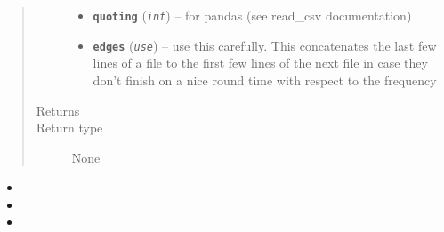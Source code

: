 \documentclass[a4paper,10pt,oneside]{sphinxmanual}
\begin{document}
\begin{fulllineitems}
\begin{quote}
\begin{description}
\begin{itemize}
\item {} 
\textbf{\texttt{quoting}} (\emph{\texttt{int}}) -- for pandas (see read\_csv documentation)

\item {} 
\textbf{\texttt{edges}} (\emph{\texttt{use}}) -- use this carefully. This concatenates the last few lines of a file to the first few lines
of the next file in case they don't finish on a nice round time with respect to the frequency

\end{itemize}

\item[{Returns}] \leavevmode


\item[{Return type}] \leavevmode
None

\end{description}\end{quote}

\end{fulllineitems}

\begin{itemize}
\item {} 

\item {} 

\item {} 

\end{itemize}
\end{document}
